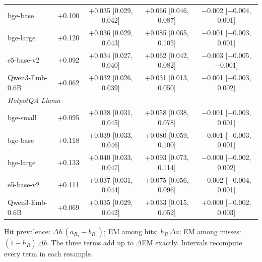 \begin{table}[t]
\begin{tabular}{lcccc}
bge-base & +0.100 & +0.035 [0.029, 0.042] & +0.066 [0.046, 0.087] & \ensuremath{-}0.002 [\ensuremath{-}0.004, 0.001] \\
bge-large & +0.120 & +0.036 [0.029, 0.043] & +0.085 [0.065, 0.105] & \ensuremath{-}0.001 [\ensuremath{-}0.003, 0.001] \\
e5-base-v2 & +0.092 & +0.034 [0.027, 0.040] & +0.062 [0.042, 0.082] & \ensuremath{-}0.003 [\ensuremath{-}0.005, \ensuremath{-}0.001] \\
Qwen3-Emb-0.6B & +0.062 & +0.032 [0.026, 0.039] & +0.031 [0.013, 0.050] & \ensuremath{-}0.001 [\ensuremath{-}0.003, 0.002] \\
\multicolumn{5}{l}{\emph{HotpotQA Llama}} \\
bge-small & +0.095 & +0.038 [0.031, 0.045] & +0.058 [0.038, 0.078] & \ensuremath{-}0.001 [\ensuremath{-}0.003, 0.001] \\
bge-base & +0.118 & +0.039 [0.033, 0.046] & +0.080 [0.059, 0.100] & \ensuremath{-}0.001 [\ensuremath{-}0.003, 0.001] \\
bge-large & +0.133 & +0.040 [0.033, 0.047] & +0.093 [0.073, 0.114] & \ensuremath{-}0.000 [\ensuremath{-}0.002, 0.002] \\
e5-base-v2 & +0.111 & +0.037 [0.031, 0.044] & +0.075 [0.056, 0.096] & \ensuremath{-}0.002 [\ensuremath{-}0.004, 0.001] \\
Qwen3-Emb-0.6B & +0.069 & +0.035 [0.029, 0.042] & +0.033 [0.015, 0.052] & +0.000 [\ensuremath{-}0.002, 0.003] \\
\bottomrule
\end{tabular}
\par\smallskip\parbox{\linewidth}{\footnotesize Hit prevalence: $\Delta\bar h\,(a_{R_1}-b_{R_1})$; EM among hits: $\bar h_R\,\Delta a$; EM among misses: $(1-\bar h_R)\,\Delta b$. The three terms add up to $\Delta$EM exactly. Intervals recompute every term in each resample.}
\end{table}
